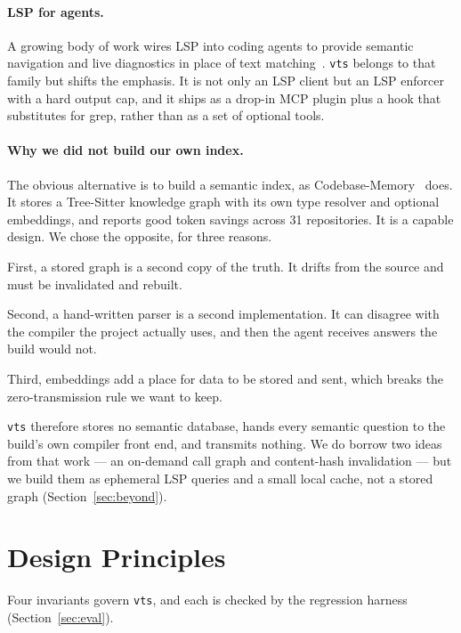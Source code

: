 \documentclass[11pt]{article}
\begin{document}
\paragraph{LSP for agents.}
A growing body of work wires LSP into coding agents to provide semantic navigation
and live diagnostics in place of text
matching~\cite{lsp-medium,anthropic-lsp,hyperagent}. \texttt{vts} belongs to that
family but shifts the emphasis. It is not only an LSP client but an LSP enforcer
with a hard output cap, and it ships as a drop-in MCP plugin plus a hook that
substitutes for grep, rather than as a set of optional tools.

\paragraph{Why we did not build our own index.}
The obvious alternative is to build a semantic index, as
Codebase-Memory~\cite{cbm} does. It stores a Tree-Sitter knowledge graph with its
own type resolver and optional embeddings, and reports good token savings across 31
repositories. It is a capable design. We chose the opposite, for three reasons.

First, a stored graph is a second copy of the truth. It drifts from the source and
must be invalidated and rebuilt.

Second, a hand-written parser is a second implementation. It can disagree with the
compiler the project actually uses, and then the agent receives answers the build
would not.

Third, embeddings add a place for data to be stored and sent, which breaks the
zero-transmission rule we want to keep.

\texttt{vts} therefore stores no semantic database, hands every semantic question
to the build's own compiler front end, and transmits nothing. We do borrow two
ideas from that work --- an on-demand call graph and content-hash invalidation ---
but we build them as ephemeral LSP queries and a small local cache, not a stored
graph (Section~\ref{sec:beyond}).

\section{Design Principles}
\label{sec:principles}

Four invariants govern \texttt{vts}, and each is checked by the regression harness
(Section~\ref{sec:eval}).
\end{document}
